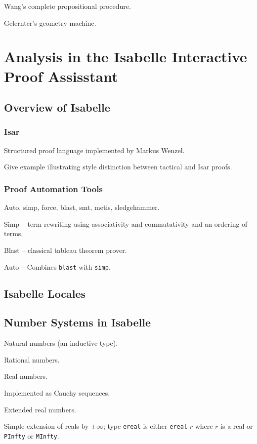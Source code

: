 \documentclass{amsart}
\theoremstyle{definition}
\theoremstyle{remark}
\begin{document}
Wang's complete propositional procedure.

Gelernter's geometry machine.

\section{Analysis in the Isabelle Interactive Proof Assisstant} \label{Isa}

\subsection{Overview of Isabelle}

\subsubsection{Isar}

Structured proof language implemented by Markus Wenzel.

Give example illustrating style distinction between tactical and Isar proofs.

\subsubsection{Proof Automation Tools}

Auto, simp, force, blast, smt, metis, sledgehammer.

Simp -- term rewriting using associativity and commutativity and an ordering of terms.

Blast -- classical tableau theorem prover.

Auto -- Combines \texttt{blast} with \texttt{simp}.

\subsection{Isabelle Locales}

\subsection{Number Systems in Isabelle}

Natural numbers (an inductive type).

Rational numbers.

Real numbers.

Implemented as Cauchy sequences.

Extended real numbers.

Simple extension of reals by $\pm \infty$; type \texttt{ereal} is either \texttt{ereal} $r$ where $r$ is a real or \texttt{PInfty} or \texttt{MInfty}.
\end{document}
